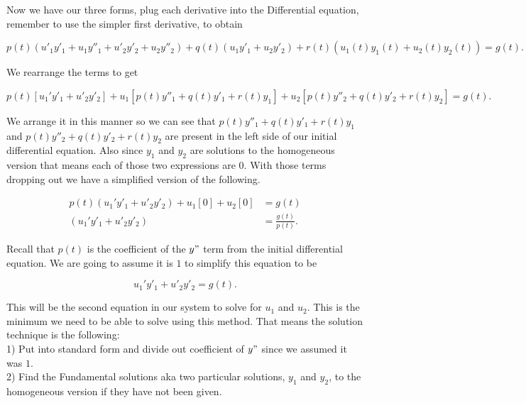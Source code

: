 \documentclass[12pt]{article}
\begin{document}
Now we have our three forms, plug each derivative into the Differential equation, remember to use the simpler first derivative, to obtain

\begin{equation*}
    p(t)\left(u'_1y'_1+u_1y''_1+u'_2y'_2+u_2y''_2\right)+q(t)\left(u_1y'_1+u_2y'_2\right)+r(t)\left(u_1(t)y_1(t)+u_2(t)y_2(t)\right)=g(t).
\end{equation*}

We rearrange the terms to get

\begin{equation*}
    p(t)\left[u_1'y'_1+u'_2y'_2\right]+u_1\left[p(t)y''_1+q(t)y'_1+r(t)y_1 \right] + u_2\left[p(t)y''_2+q(t)y'_2+r(t)y_2 \right] = g(t).
\end{equation*}

We arrange it in this manner so we can see that $p(t)y''_1+q(t)y'_1+r(t)y_1$ and $p(t)y''_2+q(t)y'_2+r(t)y_2$ are present in the left side of our initial differential equation. Also since $y_1$ and $y_2$ are solutions to the homogeneous version that means each of those two expressions are $0$. With those terms dropping out we have a simplified version of the following.

\begin{align*}
    p(t)\left(u_1'y'_1+u'_2y'_2\right)+u_1[0]+u_2[0]&=g(t) \\
    \left(u_1'y'_1+u'_2y'_2\right)&=\frac{g(t)}{p(t)}.
\end{align*}

Recall that $p(t)$ is the coefficient of the $y"$ term from the initial differential equation. We are going to assume it is $1$ to simplify this equation to be

\begin{equation*}
    u_1'y'_1+u'_2y'_2=g(t).
\end{equation*}

This will be the second equation in our system to solve for $u_1$ and $u_2$. This is the minimum we need  to be able to solve using this method. That means the solution technique is the following: \\

1) Put into standard form and divide out coefficient of $y"$ since we assumed it was $1$. \\

2) Find the Fundamental solutions aka two particular solutions, $y_1$ and $y_2$, to the homogeneous version if they have not been given. \\
\end{document}
